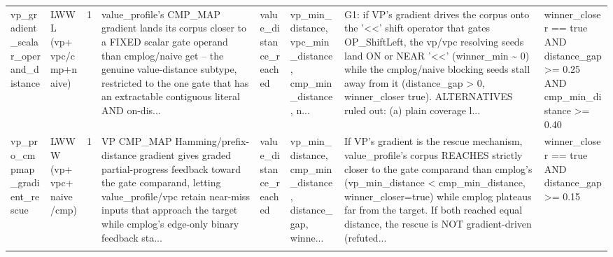 \documentclass[7pt]{extarticle}
\begin{document}
{\begin{longtable}{@{}p{2.4cm}p{1.9cm}rp{4.3cm}p{1.5cm}p{1.7cm}p{4.6cm}p{3.0cm}@{}}
vp\_\allowbreak gradient\_\allowbreak scalar\_\allowbreak operand\_\allowbreak distance & LWWL (vp+vpc/cmp+naive) & 1 & value\_\allowbreak profile's CMP\_\allowbreak MAP gradient lands its corpus closer to a FIXED scalar gate operand than cmplog/naive get -- the genuine value-distance subtype, restricted to the one gate that has an extractable contiguous literal AND on-dis... & value\_\allowbreak distance\_\allowbreak reached & vp\_\allowbreak min\_\allowbreak distance, vpc\_\allowbreak min\_\allowbreak distance, cmp\_\allowbreak min\_\allowbreak distance, n... & G1: if VP's gradient drives the corpus onto the '\textless{}\textless{}' shift operator that gates OP\_\allowbreak ShiftLeft, the vp/vpc resolving seeds land ON or NEAR '\textless{}\textless{}' (winner\_\allowbreak min \textasciitilde{} 0) while the cmplog/naive blocking seeds stall away from it (distance\_\allowbreak gap \textgreater{} 0, winner\_\allowbreak closer true). ALTERNATIVES ruled out: (a) plain coverage l... & winner\_\allowbreak closer == true AND distance\_\allowbreak gap \textgreater{}= 0.25 AND cmp\_\allowbreak min\_\allowbreak distance \textgreater{}= 0.40\\
vp\_\allowbreak pro\_\allowbreak cmpmap\_\allowbreak gradient\_\allowbreak rescue & LWWW (vp+vpc+naive/cmp) & 1 & VP CMP\_\allowbreak MAP Hamming/prefix-distance gradient gives graded partial-progress feedback toward the gate comparand, letting value\_\allowbreak profile/vpc retain near-miss inputs that approach the target while cmplog's edge-only binary feedback sta... & value\_\allowbreak distance\_\allowbreak reached & vp\_\allowbreak min\_\allowbreak distance, cmp\_\allowbreak min\_\allowbreak distance, distance\_\allowbreak gap, winne... & If VP's gradient is the rescue mechanism, value\_\allowbreak profile's corpus REACHES strictly closer to the gate comparand than cmplog's (vp\_\allowbreak min\_\allowbreak distance \textless{} cmp\_\allowbreak min\_\allowbreak distance, winner\_\allowbreak closer=true) while cmplog plateaus far from the target. If both reached equal distance, the rescue is NOT gradient-driven (refuted... & winner\_\allowbreak closer == true AND distance\_\allowbreak gap \textgreater{}= 0.15\\
\midrule
\rowcolor{black!10}\multicolumn{8}{@{}l}{\textbf{[VP-pro]\ \ vp\_\allowbreak gradient\_\allowbreak drives\_\allowbreak assembly\_\allowbreak depth}\quad(final feature, n=15)}\\

\end{longtable}}
\end{document}
